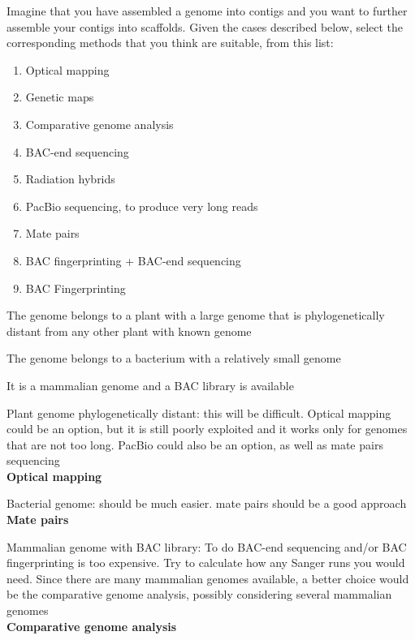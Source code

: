 \begin{Exercise} [
  label={ex25},
  origin={G. Valle}
 ]

Imagine that you have assembled a genome into contigs and you want to further
assemble your contigs into scaffolds. Given the cases described below, select
the corresponding methods that you think are suitable, from this list:
\begin{enumerate}
\item Optical mapping
\item Genetic maps
\item Comparative genome analysis
\item BAC-end sequencing
\item Radiation hybrids
\item PacBio sequencing, to produce very long reads
\item Mate pairs
\item BAC fingerprinting + BAC-end sequencing
\item BAC Fingerprinting
\end{enumerate} 

\Question The genome belongs to a plant with a large genome that is
phylogenetically distant from any other plant with known genome

\Question The genome belongs to a bacterium with a relatively small genome

\Question It is a mammalian genome and a BAC library is available

\end{Exercise}

\begin{Answer} [
  ref={ex25},
  number={1}
 ]

\Question Plant genome phylogenetically distant: this will be difficult.
Optical mapping could be an option, but it is still poorly exploited and it
works only for genomes that are not too long. PacBio could also be an option,
as well as mate pairs sequencing\\\textbf{Optical mapping}

\Question Bacterial genome: should be much easier. mate pairs should be a good
approach\\\textbf{Mate pairs}

\Question Mammalian genome with BAC library: To do BAC-end sequencing and/or
BAC fingerprinting is too expensive. Try to calculate how any Sanger runs you
would need. Since there are many mammalian genomes available, a better choice
would be the comparative genome analysis, possibly considering several
mammalian genomes\\\textbf{Comparative genome analysis}

\end{Answer}

